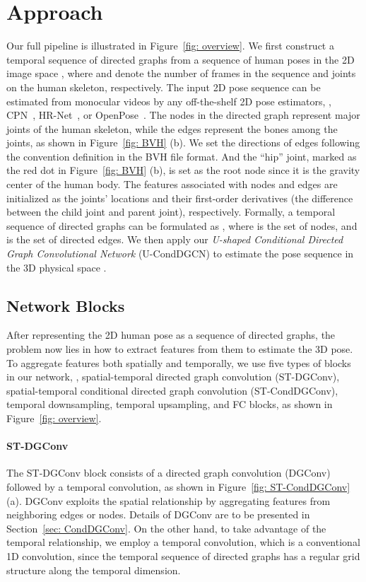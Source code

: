 \documentclass[sigconf]{acmart}
\begin{document}
 	




\section{Approach}
\label{sec:method}
Our full pipeline is illustrated in Figure~\ref{fig: overview}.
We first construct a temporal sequence of directed graphs from a sequence of human poses in the 2D image space , where  and  denote the number of frames in the sequence and joints on the human skeleton, respectively.
The input 2D pose sequence  can be estimated from monocular videos by any off-the-shelf 2D pose estimators, \eg, CPN~\cite{chen2018cascaded}, HR-Net~\cite{sun2019deep}, or OpenPose~\cite{cao2019openpose}. 
The nodes in the directed graph represent major joints of the human skeleton, while the edges represent the bones among the joints, as shown in Figure~\ref{fig: BVH} (b).
We set the directions of edges following the convention definition in the BVH file format.
And the ``hip'' joint, marked as the red dot in Figure~\ref{fig: BVH} (b), is set as the root node since it is the gravity center of the human body.
The features associated with nodes and edges are initialized as the joints' locations and their first-order derivatives (the difference between the child joint and parent joint), respectively.
Formally, a temporal sequence of directed graphs can be formulated as , where  is the set of nodes, and  is the set of directed edges.
We then apply our \emph{U-shaped Conditional Directed Graph Convolutional Network} (U-CondDGCN) to estimate the pose sequence in the 3D physical space .




\subsection{Network Blocks}
\label{sec:ST-CondDGConv}
After representing the 2D human pose as a sequence of directed graphs, the problem now lies in how to extract features from them to estimate the 3D pose.
To aggregate features both spatially and temporally, we use five types of blocks in our network, \ie, spatial-temporal directed graph convolution (ST-DGConv), spatial-temporal conditional directed graph convolution (ST-CondDGConv), temporal downsampling, temporal upsampling, and FC blocks, as shown in Figure~\ref{fig: overview}. 


\paragraph{ST-DGConv}
The ST-DGConv block consists of a directed graph convolution (DGConv) followed by a temporal convolution, as shown in Figure~\ref{fig: ST-CondDGConv} (a).
DGConv exploits the spatial relationship by aggregating features from neighboring edges or nodes.
Details of DGConv are to be presented in Section~\ref{sec: CondDGConv}.
On the other hand, to take advantage of the temporal relationship, we employ a temporal convolution, which is a conventional 1D convolution, since the temporal sequence of directed graphs has a regular grid structure along the temporal dimension.
\end{document}
